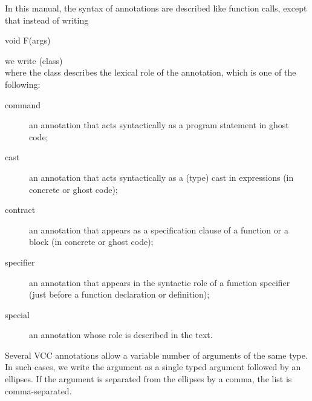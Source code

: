 \documentclass[preprint,nocopyrightspace]{sigplanconf}
\begin{document}
In this manual, the syntax of annotations are described like function
calls, except that instead of writing 
\begin{VCC}
  void F(args)
\end{VCC}
we write
\noindent{} (class)\\
where the class describes the lexical role of the annotation, which is
one of the following:
\begin{description}
\item[command] an annotation that acts syntactically as a program 
statement in ghost code;
\item[cast] an annotation that acts syntactically as a (type) cast in
expressions (in concrete or ghost code);
\item[contract] an annotation that appears as a specification clause
of a function or a block (in concrete or ghost code);
\item[specifier] an annotation that appears in the syntactic role of a
function specifier (just before a function declaration or definition);
\item[special] an annotation whose role is described in the text.
\end{description}

Several VCC annotations allow a variable number of arguments of the
same type. In such cases, we write the argument as a single typed
argument followed by an ellipses. If the argument is separated from
the ellipses by a comma, the list is comma-separated.
\end{document}
